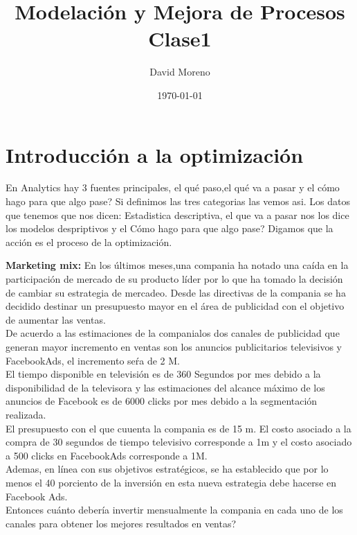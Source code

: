 \documentclass{report}
\title{\Huge{Modelación y Mejora de Procesos}\\Clase1}
\author{\huge{David Moreno}}
\date{\today}
\begin{document}
\maketitle

\section{Introducción a la optimización}

En Analytics hay 3 fuentes principales, el qué paso‚el qué va a pasar
y el cómo hago para que algo pase? Si definimos las tres categorias
las vemos asi. Los datos que tenemos que nos dicen: Estadistica
descriptiva, el que va a pasar nos los dice los modelos despriptivos y
el Cómo hago para que algo pase? Digamos que la acción es el proceso
de la optimización.

\begin{exa}
\textbf{Marketing mix:} En los últimos meses,una compania ha notado
una caída en la participación de mercado de su producto líder por lo
que ha tomado la decisión de cambiar su estrategia de mercadeo. Desde
las directivas de la compania se ha decidido destinar un presupuesto
mayor en el área de publicidad con el objetivo de aumentar las
ventas.\\ 
De acuerdo a las estimaciones de la companialos dos canales de
publicidad que generan mayor incremento en ventas son los anuncios
publicitarios televisivos y FacebookAds, el incremento seŕa de 2 M.\\

El tiempo disponible en televisión es de 360 Segundos por mes debido a
la disponibilidad de la televisora y las estimaciones del alcance
máximo de los anuncios de Facebook es de 6000 clicks por mes debido a
la segmentación realizada.\\

El presupuesto con el que cuuenta la compania es de 15 m.
El costo asociado a la compra de 30 segundos de tiempo televisivo
corresponde a 1m y el costo asociado a 500 clicks en FacebookAds
corresponde a 1M.\\

Ademas, en línea con sus objetivos estratégicos, se ha establecido que
por lo menos el 40 porciento de la inversión en esta nueva estrategia
debe hacerse en Facebook Ads.\\

Entonces cuánto debería invertir mensualmente la compania en cada uno
de los canales para obtener los mejores resultados en ventas?


\end{exa}
\end{document}
